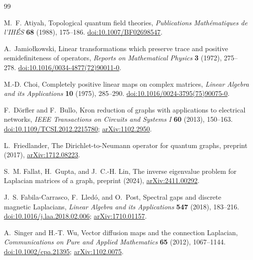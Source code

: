 \documentclass[11pt]{article}
\numberwithin{equation}{section}
\theoremstyle{definition}
\theoremstyle{remark}
\begin{document}
\begin{thebibliography}{99}

M.~F. Atiyah,
\newblock Topological quantum field theories,
\newblock \emph{Publications Math\'ematiques de l'IH\'ES} \textbf{68}
  (1988), 175--186.
\newblock \href{https://doi.org/10.1007/BF02698547}{doi:10.1007/BF02698547}.

A.~Jamio\l kowski,
\newblock Linear transformations which preserve trace and positive
  semidefiniteness of operators,
\newblock \emph{Reports on Mathematical Physics} \textbf{3} (1972), 275--278.
\newblock \href{https://doi.org/10.1016/0034-4877(72)90011-0}
  {doi:10.1016/0034-4877(72)90011-0}.

M.-D. Choi,
\newblock Completely positive linear maps on complex matrices,
\newblock \emph{Linear Algebra and its Applications} \textbf{10} (1975),
  285--290.
\newblock \href{https://doi.org/10.1016/0024-3795(75)90075-0}
  {doi:10.1016/0024-3795(75)90075-0}.

F.~D\"orfler and F.~Bullo,
\newblock Kron reduction of graphs with applications to electrical networks,
\newblock \emph{IEEE Transactions on Circuits and Systems I} \textbf{60}
  (2013), 150--163.
\newblock \href{https://doi.org/10.1109/TCSI.2012.2215780}
  {doi:10.1109/TCSI.2012.2215780};
  \href{https://arxiv.org/abs/1102.2950}{arXiv:1102.2950}.

L.~Friedlander,
\newblock The Dirichlet-to-Neumann operator for quantum graphs,
\newblock preprint (2017),
  \href{https://arxiv.org/abs/1712.08223}{arXiv:1712.08223}.

S.~M. Fallat, H.~Gupta, and J.~C.-H. Lin,
\newblock The inverse eigenvalue problem for Laplacian matrices of a graph,
\newblock preprint (2024),
  \href{https://arxiv.org/abs/2411.00292}{arXiv:2411.00292}.

J.~S. Fabila-Carrasco, F.~Lled\'o, and O.~Post,
\newblock Spectral gaps and discrete magnetic Laplacians,
\newblock \emph{Linear Algebra and its Applications} \textbf{547} (2018),
  183--216.
\newblock \href{https://doi.org/10.1016/j.laa.2018.02.006}
  {doi:10.1016/j.laa.2018.02.006};
  \href{https://arxiv.org/abs/1710.01157}{arXiv:1710.01157}.

A.~Singer and H.-T. Wu,
\newblock Vector diffusion maps and the connection Laplacian,
\newblock \emph{Communications on Pure and Applied Mathematics} \textbf{65}
  (2012), 1067--1144.
\newblock \href{https://doi.org/10.1002/cpa.21395}{doi:10.1002/cpa.21395};
  \href{https://arxiv.org/abs/1102.0075}{arXiv:1102.0075}.


\end{thebibliography}
\end{document}
